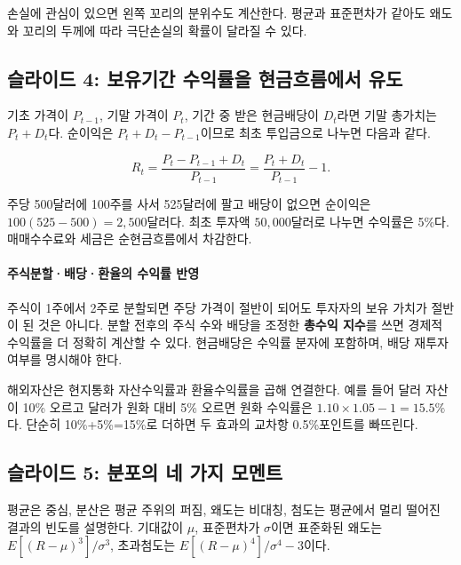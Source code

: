 \documentclass[11pt,a4paper]{article}
\begin{document}
손실에 관심이 있으면 왼쪽 꼬리의 분위수도 계산한다. 평균과 표준편차가 같아도 왜도와 꼬리의 두께에 따라 극단손실의 확률이 달라질 수 있다.
\par

\subsection{슬라이드 4: 보유기간 수익률을 현금흐름에서 유도}

기초 가격이 $P_{t-1}$, 기말 가격이 $P_t$, 기간 중 받은 현금배당이 $D_t$라면 기말 총가치는 $P_t+D_t$다. 순이익은 $P_t+D_t-P_{t-1}$이므로 최초 투입금으로 나누면 다음과 같다.
\par

\[
R_t=\frac{P_t-P_{t-1}+D_t}{P_{t-1}}=\frac{P_t+D_t}{P_{t-1}}-1.
\]

주당 500달러에 100주를 사서 525달러에 팔고 배당이 없으면 순이익은 $100(525-500)=2{,}500$달러다. 최초 투자액 $50{,}000$달러로 나누면 수익률은 5\%다. 매매수수료와 세금은 순현금흐름에서 차감한다.
\par

\paragraph{주식분할·배당·환율의 수익률 반영}

주식이 1주에서 2주로 분할되면 주당 가격이 절반이 되어도 투자자의 보유 가치가 절반이 된 것은 아니다. 분할 전후의 주식 수와 배당을 조정한 \textbf{총수익 지수}를 쓰면 경제적 수익률을 더 정확히 계산할 수 있다. 현금배당은 수익률 분자에 포함하며, 배당 재투자 여부를 명시해야 한다.
\par

해외자산은 현지통화 자산수익률과 환율수익률을 곱해 연결한다. 예를 들어 달러 자산이 10\% 오르고 달러가 원화 대비 5\% 오르면 원화 수익률은 $1.10\times1.05-1=15.5\%$다. 단순히 10\%+5\%=15\%로 더하면 두 효과의 교차항 0.5\%포인트를 빠뜨린다.
\par

\subsection{슬라이드 5: 분포의 네 가지 모멘트}

평균은 중심, 분산은 평균 주위의 퍼짐, 왜도는 비대칭, 첨도는 평균에서 멀리 떨어진 결과의 빈도를 설명한다. 기대값이 $\mu$, 표준편차가 $\sigma$이면 표준화된 왜도는 $E[(R-\mu)^3]/\sigma^3$, 초과첨도는 $E[(R-\mu)^4]/\sigma^4-3$이다.
\par
\end{document}
